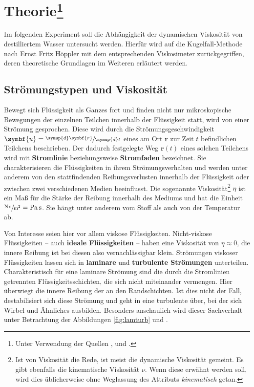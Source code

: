 \section{Theorie\footnote{Unter Verwendung der Quellen \cite{demtroeder}, \cite{Versuchsanleitung} und \cite{gerthsen}.}}
\label{sec:Theorie}

Im folgenden Experiment soll die Abhängigkeit der dynamischen Viskosität von destilliertem Wasser untersucht werden. 
Hierfür wird auf die Kugelfall-Methode nach Ernst Fritz Höppler mit dem entsprechenden Viskosimeter zurückgegriffen, deren theoretische 
Grundlagen im Weiteren erläutert werden. 

\subsection{Strömungstypen und Viskosität}

Bewegt sich Flüssigkeit als Ganzes fort und finden nicht nur mikroskopische Bewegungen der einzelnen Teilchen innerhalb der 
Flüssigkeit statt, wird von einer Strömung gesprochen. 
Diese wird durch die Strömungsgeschwindigkeit ${\symbf{u}=\sfrac{\symup{d}\symbf{r}}{\symup{d}t}}$ eines am Ort $\symbf{r}$ 
zur Zeit $t$ befindlichen Teilchens beschrieben. 
Der dadurch festgelegte Weg $\symbf{r}(t)$ eines solchen Teilchens wird mit \textbf{Stromlinie} beziehungsweise 
\textbf{Stromfaden} bezeichnet. 
Sie charakterisieren die Flüssigkeiten in ihrem Strömungsverhalten und werden unter anderem von den stattfindenden 
Reibungsverlusten innerhalb der Flüssigkeit oder zwischen zwei verschiedenen Medien beeinflusst. 
Die sogenannte Viskosität\footnote{Ist von Viskosität die Rede, ist meist die dynamische Viskosität gemeint. Es gibt ebenfalls 
die kinematische Viskosität $\nu$. Wenn diese erwähnt werden soll, wird dies üblicherweise ohne Weglassung des Attributs \textit{kinematisch} getan.} 
$\eta$ ist ein Maß für die Stärke der Reibung innerhalb des Mediums und hat die Einheit 
${\sfrac{\si{\newton\second}}{\si{\meter\squared}}=\si{\pascal\second}}$. 
Sie hängt unter anderem vom Stoff als auch von der Temperatur ab. 

Von Interesse seien hier vor allem viskose Flüssigkeiten. Nicht-viskose Flüssigkeiten -- auch \textbf{ideale Flüssigkeiten} 
-- haben eine Viskosität von ${\eta \approx 0}$, die innere Reibung ist bei diesen also vernachlässigbar klein. 
Strömungen viskoser Flüssigkeiten lassen sich in \textbf{laminare} und \textbf{turbulente Strömungen} unterteilen. 
Charakteristisch für eine laminare Strömung sind die durch die Stromlinien getrennten Flüssigkeitsschichten, die sich nicht miteinander vermengen. 
Hier überwiegt die innere Reibung der an den Randschichten. 
Ist dies nicht der Fall, destabilisiert sich diese Strömung und geht in eine turbulente über, bei der sich Wirbel und Ähnliches 
ausbilden. 
Besonders anschaulich wird dieser Sachverhalt unter Betrachtung der Abbildungen \ref{fig:lamturb}  und . 

